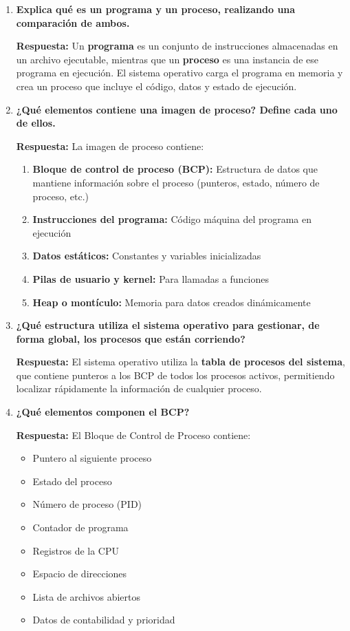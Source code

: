 \documentclass[a4paper,12pt]{article}
\begin{document}
\begin{enumerate}[label=\textbf{Pregunta \arabic*.},left=0pt,itemsep=1.5em]

\item \textbf{Explica qué es un programa y un proceso, realizando una comparación de ambos.}

\textbf{Respuesta:} Un \textbf{programa} es un conjunto de instrucciones almacenadas en un archivo ejecutable, mientras que un \textbf{proceso} es una instancia de ese programa en ejecución. El sistema operativo carga el programa en memoria y crea un proceso que incluye el código, datos y estado de ejecución.

\item \textbf{¿Qué elementos contiene una imagen de proceso? Define cada uno de ellos.}

\textbf{Respuesta:} La imagen de proceso contiene:
\begin{enumerate}[label=\alph*)]
    \item \textbf{Bloque de control de proceso (BCP):} Estructura de datos que mantiene información sobre el proceso (punteros, estado, número de proceso, etc.)
    \item \textbf{Instrucciones del programa:} Código máquina del programa en ejecución
    \item \textbf{Datos estáticos:} Constantes y variables inicializadas
    \item \textbf{Pilas de usuario y kernel:} Para llamadas a funciones
    \item \textbf{Heap o montículo:} Memoria para datos creados dinámicamente
\end{enumerate}

\item \textbf{¿Qué estructura utiliza el sistema operativo para gestionar, de forma global, los procesos que están corriendo?}

\textbf{Respuesta:} El sistema operativo utiliza la \textbf{tabla de procesos del sistema}, que contiene punteros a los BCP de todos los procesos activos, permitiendo localizar rápidamente la información de cualquier proceso.

\item \textbf{¿Qué elementos componen el BCP?}

\textbf{Respuesta:} El Bloque de Control de Proceso contiene:
\begin{itemize}
    \item Puntero al siguiente proceso
    \item Estado del proceso
    \item Número de proceso (PID)
    \item Contador de programa
    \item Registros de la CPU
    \item Espacio de direcciones
    \item Lista de archivos abiertos
    \item Datos de contabilidad y prioridad
\end{itemize}


\end{enumerate}
\end{document}
